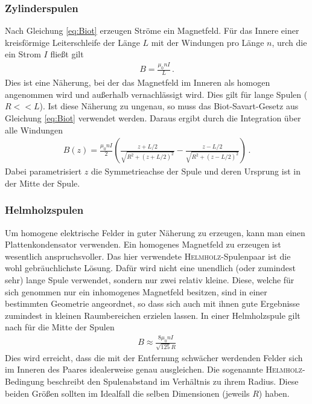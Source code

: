 \documentclass[12pt,a4paper,titlepage,headinclude,bibtotoc]{scrartcl}
\begin{document}
\subsubsection*{Zylinderspulen}
Nach Gleichung \ref{eq:Biot} erzeugen Ströme ein Magnetfeld.
Für das Innere einer kreisförmige Leiterschleife der Länge $L$ mit der Windungen pro Länge $n$, urch die ein Strom $I$ fließt gilt
\begin{align}
	B=\frac{\mu_0 nI}L\,.
\end{align}
Dies ist eine Näherung, bei der das Magnetfeld im Inneren als homogen angenommen wird und außerhalb vernachlässigt wird.
Dies gilt für lange Spulen ($R<<L$).
Ist diese Näherung zu ungenau, so muss das Biot-Savart-Gesetz aus Gleichung \eqref{eq:Biot} verwendet werden.
Daraus ergibt durch die Integration über alle Windungen
\begin{align}
	B(z)=\frac{\mu_0 nI}{2}\left(\frac{z+L/2}{\sqrt{R^2+(z+L/2)^2}}-\frac{z-L/2}{\sqrt{R^2+(z-L/2)^2}}\right)\,.\label{eq:BSpule}
\end{align}
Dabei parametrisiert $z$ die Symmetrieachse der Spule und deren Ursprung ist in der Mitte der Spule.

\subsubsection*{Helmholzspulen}
Um homogene elektrische Felder in guter Näherung zu erzeugen, kann man einen Plattenkondensator verwenden.
Ein homogenes Magnetfeld zu erzeugen ist wesentlich anspruchsvoller. 
Das hier verwendete \textsc{Helmholz}-Spulenpaar ist die wohl gebräuchlichste Lösung.
Dafür wird nicht eine unendlich (oder zumindest sehr) lange Spule verwendet, sondern nur zwei relativ kleine.
Diese, welche für sich genommen nur ein inhomogenes Magnetfeld besitzen, sind in einer bestimmten Geometrie angeordnet, so dass sich auch mit ihnen gute Ergebnisse zumindest in kleinen Raumbereichen erzielen lassen.
In einer Helmholzspule gilt nach \cite[S. 94]{demtroeder2} für die Mitte der Spulen
\begin{align}
	B\approx\frac{8\mu_0nI}{\sqrt{125}R}\label{eq:BHelm}
\end{align}
Dies wird erreicht, dass die mit der Entfernung schwächer werdenden Felder sich im Inneren des Paares idealerweise genau ausgleichen.
Die sogenannte \textsc{Helmholz}-Bedingung beschreibt den Spulenabstand im Verhältnis zu ihrem Radius.
Diese beiden Größen sollten im Idealfall die selben Dimensionen (jeweils $R$) haben.\\
\end{document}

